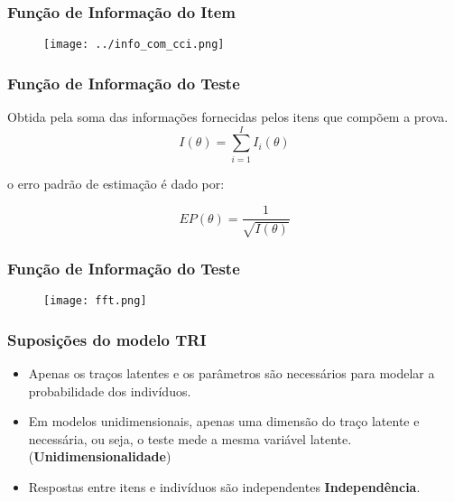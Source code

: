 \documentclass{beamer}
\begin{document}
	
	\begin{frame}
		
		\frametitle{Função de Informação do Item}

		\begin{figure}
			\texttt{[image: ../info\_com\_cci.png]}
		\end{figure}
		
	\end{frame}
	
	\begin{frame}
			
			\frametitle{Função de Informação do Teste}
		
		Obtida pela soma das informações fornecidas pelos itens que compõem a prova.	
			\[
			I(\theta) = \sum_{i=1}^{I}I_i(\theta)
			\]
	
		o erro padrão de estimação é dado por:
			
			\[
			EP(\theta) = \dfrac{1}{\sqrt{I(\theta)}}
			\]
			
	\end{frame}	
		
	\begin{frame}
		
		\frametitle{Função de Informação do Teste}

		\begin{figure}
			\texttt{[image: fft.png]}
		\end{figure}
		
	
			
		
	\end{frame}
	
	\begin{frame}
		
		\frametitle{Suposições do modelo TRI}
	
		\begin{itemize}
			
			\item<1-> Apenas os traços latentes e os parâmetros são necessários para modelar a probabilidade dos indivíduos.
						
			\item<1-> Em modelos unidimensionais, apenas uma dimensão do traço latente e necessária, ou seja, o teste mede a mesma variável latente. (\textbf{Unidimensionalidade})
			
			\item<1-> Respostas entre itens e indivíduos são independentes \textbf{Independência}.
	
		\end{itemize}
		
	\end{frame}
	
\end{document}
